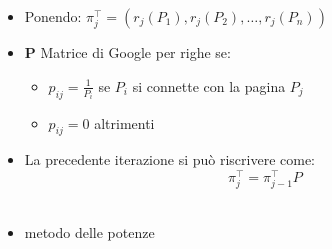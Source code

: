 \documentclass{beamer}
\begin{document}
\begin{frame}
	\begin{itemize}
		\item Ponendo: $\pi_j^\intercal = (r_j(P_1),r_j(P_2),\dots,r_j(P_n))$\\
		\item \textbf{P} Matrice di Google per righe se:
		\begin{itemize}
			\item $p_{ij}= \frac{1}{P_i}$ se $P_i$ si connette con la pagina $P_j$
			\item $p_{ij}=0$ altrimenti
		\end{itemize}
		\item La precedente iterazione si può riscrivere come: $$ \pi_j^\intercal = \pi_{j-1}^\intercal P$$\\
		\item metodo delle potenze
	\end{itemize}
\end{frame}

\end{document}
